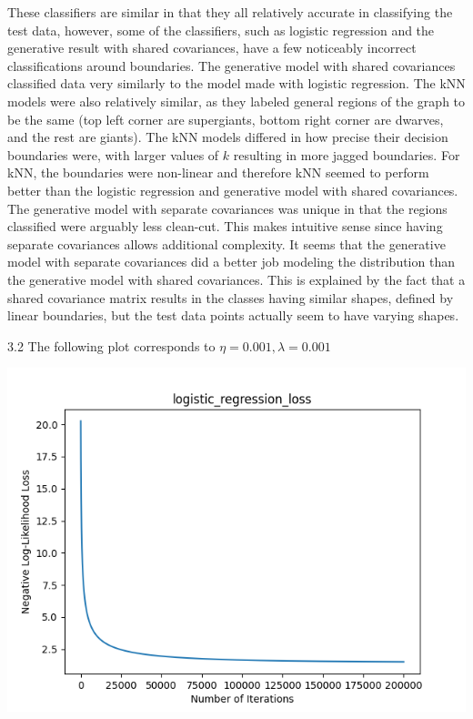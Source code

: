 \documentclass[submit]{harvardml}
\begin{document}
These classifiers are similar in that they all relatively accurate in classifying the test data, however, some of the classifiers, such as logistic regression and the generative result with shared covariances, have a few noticeably incorrect classifications around boundaries. The generative model with shared covariances classified data very similarly to the model made with logistic regression. The kNN models were also relatively similar, as they labeled general regions of the graph to be the same (top left corner are supergiants, bottom right corner are dwarves, and the rest are giants). The kNN models differed in how precise their decision boundaries were, with larger values of $k$ resulting in more jagged boundaries. For kNN, the boundaries were non-linear and therefore kNN seemed to perform better than the logistic regression and generative model with shared covariances. The generative model with separate covariances was unique in that the regions classified were arguably less clean-cut. This makes intuitive sense since having separate covariances allows additional complexity. It seems that the generative model with separate covariances did a better job modeling the distribution than the generative model with shared covariances. This is explained by the fact that a shared covariance matrix results in the classes having similar shapes, defined by linear boundaries, but the test data points actually seem to have varying shapes.

3.2 The following plot corresponds to $\eta = 0.001, \lambda = 0.001$
\begin{center}
    \includegraphics[scale=0.7]{logistic_regression_loss.png}\\
\end{center}
\end{document}
